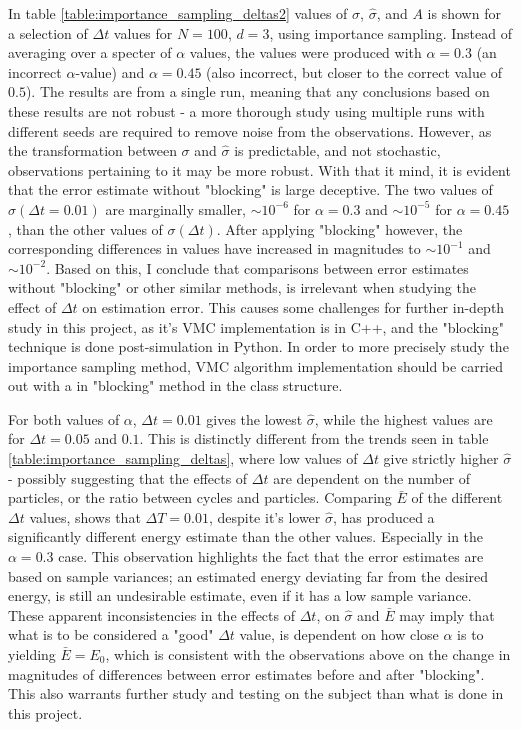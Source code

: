 \documentclass[%
oneside,                 %
final,                   %
10pt]{article}
\begin{document}
In table \ref{table:importance_sampling_deltas2} values of $\sigma$, $\hat \sigma$, and $A$ is shown for a selection of $\Delta t$ values for $N=100$, $d=3$, using importance sampling. Instead of averaging over a specter of $\alpha$ values, the values were produced with $\alpha=0.3$ (an incorrect $\alpha$-value) and $\alpha=0.45$ (also incorrect, but closer to the correct value of $0.5$). The results are from a single run, meaning that any conclusions based on these results are not robust - a more thorough study using multiple runs with different seeds are required to remove noise from the observations. However, as the transformation between $\sigma$ and $\hat \sigma$ is predictable, and not stochastic, observations pertaining to it may be more robust.
With that it mind, it is evident that the error estimate without "blocking" is large deceptive. The two values of $\sigma (\Delta t=0.01)$ are marginally smaller, $\sim 10^{-6}$ for $\alpha=0.3$ and $\sim 10^{-5}$ for $\alpha=0.45$, than the other values of $\sigma (\Delta t)$. After applying "blocking" however, the corresponding differences in values have increased in magnitudes to  $\sim 10^{-1}$  and $\sim 10^{-2}$. Based on this, I conclude that comparisons between error estimates without "blocking" or other similar methods, is irrelevant when studying the effect of $\Delta t$ on estimation error. This causes some challenges for further in-depth study in this project, as it's VMC implementation is in C++, and the "blocking" technique is done post-simulation in Python. In order to more precisely study the importance sampling method, VMC algorithm implementation should be carried out with a in "blocking" method in the class structure.

For both values of $\alpha$, $\Delta t=0.01$ gives the lowest $\hat \sigma$, while the highest values are for $\Delta t=0.05$ and $0.1$. This is distinctly different from the trends seen in table \ref{table:importance_sampling_deltas}, where low values of $\Delta t$ give strictly higher $\hat \sigma$ - possibly suggesting that the effects of $\Delta t$ are dependent on the number of particles, or the ratio between cycles and particles. Comparing $\bar E$ of the different $\Delta t$ values, shows that $\Delta T=0.01$, despite it's lower $\hat \sigma$, has produced a significantly different energy estimate than the other values. Especially in the $\alpha=0.3$ case. This observation highlights the fact that the error estimates are based on sample variances; an estimated energy deviating far from the desired energy, is still an undesirable estimate, even if it has a low sample variance. These apparent inconsistencies in the effects of $\Delta t$, on $\hat \sigma$ and $\bar E$ may imply that what is to be considered a "good" $\Delta t$ value, is dependent on how close $\alpha$ is to yielding $\bar E = E_0$, which is consistent with the observations above on the change in magnitudes of differences between error estimates before and after "blocking". This also warrants further study and testing on the subject than what is done in this project. 
\end{document}
